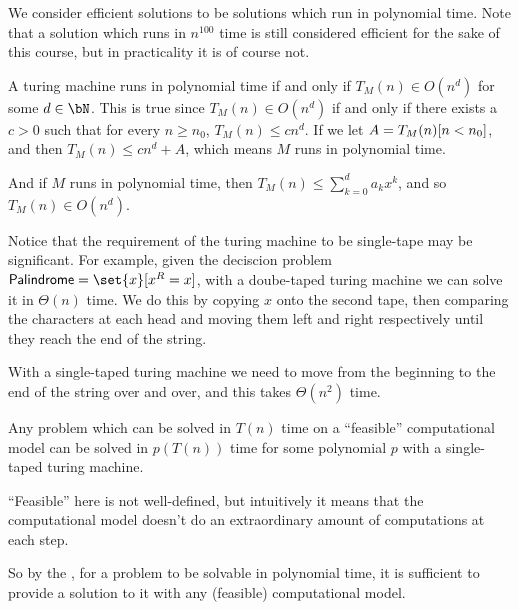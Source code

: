 \documentclass[10pt]{article}
\begin{document}
We consider efficient solutions to be solutions which run in polynomial time.
Note that a solution which runs in $n^{100}$ time is still considered efficient for the sake of this course, but in practicality it is of course not.

\begin{note}

    A turing machine runs in polynomial time if and only if $T_M(n)\in O(n^d)$ for some $d\in\bN$.
    This is true since $T_M(n)\in O(n^d)$ if and only if there exists a $c>0$ such that for every $n\geq n_0$, $T_M(n)\leq cn^d$.
    If we let $A=\maxof{T_M(n)}[n<n_0]$, and then $T_M(n)\leq cn^d+A$, which means $M$ runs in polynomial time.

    And if $M$ runs in polynomial time, then $T_M(n)\leq\sum_{k=0}^d a_kx^k$, and so $T_M(n)\in O(n^d)$.

\end{note}

\begin{note}

    Notice that the requirement of the turing machine to be single-tape may be significant.
    For example, given the deciscion problem $\mathsf{Palindrome}=\set{x}[x^R=x]$, with a doube-taped turing machine we can solve it in $\Theta(n)$ time.
    We do this by copying $x$ onto the second tape, then comparing the characters at each head and moving them left and right respectively until they reach the end of the string.

    With a single-taped turing machine we need to move from the beginning to the end of the string over and over, and this takes $\Theta(n^2)$ time.

\end{note}

\begin{conj*}

    Any problem which can be solved in $T(n)$ time on a ``feasible'' computational model can be solved in $p(T(n))$ time for some polynomial $p$ with a single-taped turing machine.

\end{conj*}

``Feasible'' here is not well-defined, but intuitively it means that the computational model doesn't do an extraordinary amount of computations at each step.

\newpage
So by the , for a problem to be solvable in polynomial time, it is sufficient to provide a solution to it with any (feasible) computational model.
\end{document}
